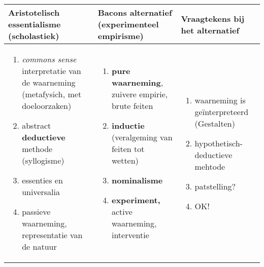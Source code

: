 \documentclass[11pt,a4paper]{article}
\begin{document}
\begin{flushleft}
\begin{tabular}{p{6cm} p{5cm} p{4cm}}
	\hline
	
	 \raggedright Aristotelisch essentialisme (scholastiek) & Bacons alternatief (experimenteel empirisme) & Vraagtekens bij het alternatief\\
	\hline
	\begin{flushleft}
	\begin{enumerate}
	
	\item \textit{commons sense} interpretatie van de waarneming (metafysich, met doeloorzaken)
	\item abstract \textbf{deductieve} methode (syllogisme)
	\item essenties en universalia
	\item passieve waarneming, representatie van de natuur
	\end{enumerate}	 
	\end{flushleft}
	
	&
	\begin{flushleft}
	\begin{enumerate}
	\item \textbf{pure waarneming}, zuivere empirie, brute feiten
	\item \textbf{inductie} (veralgeming van feiten tot wetten)
	\item \textbf{nominalisme}
	\item \textbf{experiment,} active waarneming, interventie
	\end{enumerate}
	\end{flushleft}
	&
	
	\begin{flushleft}
	\begin{enumerate}
	
	\item waarneming is ge\"interpreteerd (Gestalten)
	\item hypothetisch- deductieve mehtode
	\item patstelling?
	\item OK!
	
	\end{enumerate}
	\end{flushleft}

	\\
	
	\hline
	
\end{tabular}
\end{flushleft}
\end{document}
